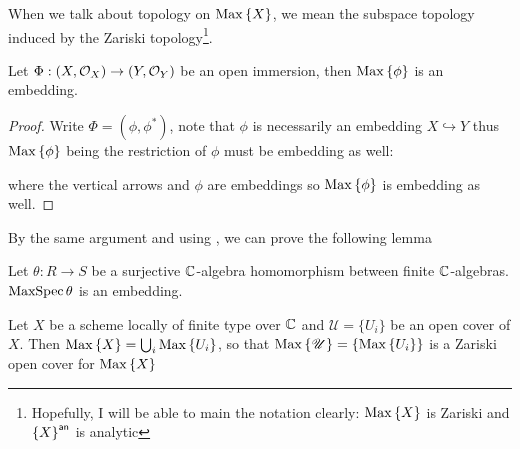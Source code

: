 When we talk about topology on $\operatorname{Max}\left\{X\right\}$, we mean the subspace topology induced by the Zariski topology\footnote{Hopefully, I will be able to main the notation clearly: $\operatorname{Max}\left\{X\right\}$ is Zariski and ${\left\{{X}\right\}}^{\mathsf{an}}$ is analytic}.

\begin{corollary}
  Let $\Phi: \left(X, \mathcal{O}_{X}\right) \to \left(Y, \mathcal{O}_{Y}\right)$ be an open immersion, then $\operatorname{Max}\left\{\phi\right\}$ is an embedding.
\end{corollary}

\begin{proof}
  Write $\Phi= (\phi, \phi^{*})$, note that $\phi$ is necessarily an embedding $X \hookrightarrow Y$ thus $\operatorname{Max}\left\{\phi\right\}$ being the restriction of $\phi$ must be embedding as well:
  \begin{center}
  \end{center}
  where the vertical arrows and $\phi$ are embeddings so $\operatorname{Max}\left\{\phi\right\}$ is embedding as well.
\end{proof}

By the same argument and using , we can prove the following lemma
\begin{lemma}
  Let $\theta: R \to S$ be a surjective $\mathbb{C}$-algebra homomorphism between finite $\mathbb{C}$-algebras.
  $\operatorname{MaxSpec} \theta$ is an embedding.
\end{lemma}

\begin{remark}
  Let $X$ be a scheme locally of finite type over $\mathbb{C}$ and $\mathscr{U} = \{U_{i}\}$ be an open cover of $X$. Then $\operatorname{Max}\left\{X\right\} = \bigcup_{i}\operatorname{Max}\left\{U_{i}\right\}$, so that $\operatorname{Max}\left\{\mathscr{U}\right\} = \{\operatorname{Max}\left\{U_{i}\right\}\}$ is a Zariski open cover for $\operatorname{Max}\left\{X\right\}$
\end{remark}


